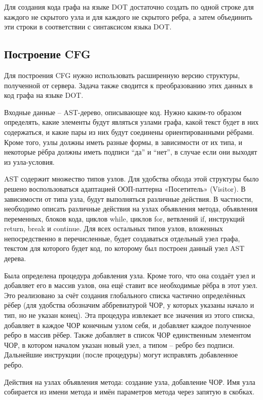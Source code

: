 Для создания кода графа на языке DOT достаточно создать по одной строке для каждого не скрытого узла и для каждого не скрытого ребра, а затем объединить эти строки в соответствии с синтаксисом языка DOT.

\subsection{Построение CFG} \label{ch2:subsec-title-abbr}
Для построения CFG нужно использовать расширенную версию структуры, полученной от сервера. Задача также сводится к преобразованию этих данных в код графа на языке DOT.

Входные данные – AST-дерево, описывающее код. Нужно каким-то образом определять, какие элементы будут являться узлами графа, какой текст будет в них содержаться, и какие пары из них будут соединены ориентированными рёбрами. Кроме того, узлы должны иметь разные формы, в зависимости от их типа, и некоторые рёбра должны иметь подписи “да” и “нет”, в случае если они выходят из узла-условия.

AST содержит множество типов узлов. Для удобства обхода этой структуры было решено воспользоваться адаптацией ООП-паттерна «Посетитель» (Visitor). В зависимости от типа узла, будут выполняться различные действия. В частности, необходимо описать различные действия на узлах объявления метода, объявления переменных, блоков кода, циклов while, циклов for, ветвлений if, инструкций return, break и continue. Для всех остальных типов узлов, вложенных непосредственно в перечисленные, будет создаваться отдельный узел графа, текстом для которого будет код, по которому был построен данный узел AST дерева.

Была определена процедура добавления узла. Кроме того, что она создаёт узел и добавляет его в массив узлов, она ещё ставит все необходимые рёбра в этот узел. Это реализовано за счёт создания глобального списка частично определённых рёбер (для удобства обозначим аббревиатурой ЧОР, у которых указаны начало и тип, но не указан конец). Эта процедура извлекает все значения из этого списка, добавляет в каждое ЧОР конечным узлом себя, и добавляет каждое полученное ребро в массив рёбер. Также добавляет в список ЧОР единственным элементом ЧОР, в котором началом указан новый узел, а типом – ребро без подписи. Дальнейшие инструкции (после процедуры) могут исправлять добавленное ребро.

Действия на узлах объявления метода: создание узла, добавление ЧОР. Имя узла собирается из имени метода и имён параметров метода через запятую в скобках.

